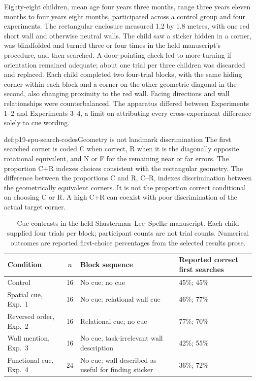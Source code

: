 Eighty-eight children, mean age four years three months, range
three years eleven months to four years eight months, participated
across a control group and four experiments.
The rectangular enclosure measured 1.2 by 1.8 metres, with one
red short wall and otherwise neutral walls.
The child saw a sticker hidden in a corner, was blindfolded and
turned three or four times in the held manuscript's procedure,
and then searched. A door-pointing check led to more turning if
orientation remained adequate; about one trial per three children
was discarded and replaced.
Each child completed two four-trial blocks, with the same hiding
corner within each block and a corner on the other geometric diagonal
in the second, also changing proximity to the red wall.
Facing directions and wall relationships were
counterbalanced. The apparatus differed between Experiments 1--2
and Experiments 3--4, a limit on attributing every cross-experiment
difference solely to cue wording.

\begin{hbdefinition}{def:p19-spu-search-codes}{Geometry is not landmark discrimination}
The first searched corner is coded C when correct, R when it is
the diagonally opposite rotational equivalent, and N or F for
the remaining near or far errors.
The proportion C+R indexes choices consistent with the rectangular
geometry. The difference between the proportions C and R, C--R,
indexes discrimination between the geometrically equivalent corners.
It is not the proportion correct conditional on choosing C or R.
A high C+R can coexist with poor discrimination of the actual
target corner.
\end{hbdefinition}

\begin{table}[htbp]
\centering
\small
\caption{Cue contrasts in the held Shusterman--Lee--Spelke manuscript.
Each child supplied four trials per block; participant counts are
not trial counts. Numerical outcomes are reported first-choice
percentages from the selected results prose.}
\label{tab:p19-spu-cues}
\begin{tabular}{p{}cp{}p{}}
\hline
Condition & \(n\) & Block sequence & Reported correct first searches\\
\hline
Control & 16 & No cue; no cue & 45\%; 45\%\\
Spatial cue, Exp.\ 1 & 16 & No cue; relational wall cue & 46\%; 77\%\\
Reversed order, Exp.\ 2 & 16 & Relational cue; no cue & 77\%; 70\%\\
Wall mention, Exp.\ 3 & 16 & No cue; task-irrelevant wall description & 42\%; 55\%\\
Functional cue, Exp.\ 4 & 24 & No cue; wall described as useful for finding sticker & 36\%; 72\%\\
\hline
\end{tabular}
\end{table}

